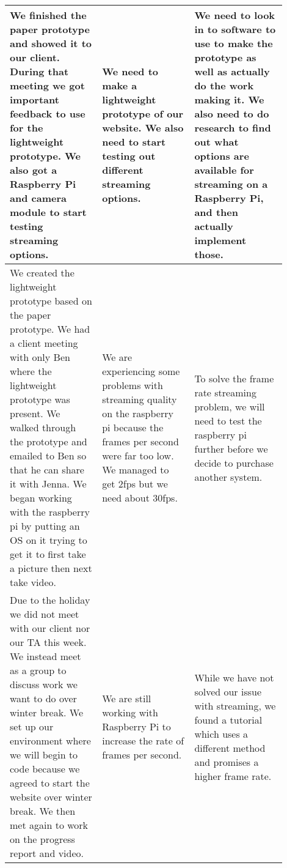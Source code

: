 \documentclass[onecolumn, draftclsnofoot,10pt, compsoc]{IEEEtran}
\begin{document}
         \newpage
         \begin{tabular}{p{0.3\linewidth} | p{0.3\linewidth} | p{0.3\linewidth}}
         We finished the paper prototype and showed it to our client. During that meeting we got important feedback to use for the lightweight prototype. We also got a Raspberry Pi and camera module to start testing streaming options.&
         We need to make a lightweight prototype of our website. We also need to start testing out different streaming options.&
         We need to look in to software to use to make the prototype as well as actually do the work making it. We also need to do research to find out what options are available for streaming on a Raspberry Pi, and then actually implement those.\\
         \hline
         We created the lightweight prototype based on the paper prototype. We had a client meeting with only Ben where the lightweight prototype was present. We walked through the prototype and emailed to Ben so that he can share it with Jenna. We began working with the raspberry pi by putting an OS on it trying to get it to first take a picture then next take video.&
         We are experiencing some problems with streaming quality on the raspberry pi because the frames per second were far too low. We managed to get 2fps but we need about 30fps. &
         To solve the frame rate streaming problem, we will need to test the raspberry pi further before we decide to purchase another system.\\
         \hline
         Due to the holiday we did not meet with our client nor our TA this week. We instead meet as a group to discuss work we want to do over winter break. We set up our environment where we will begin to code because we agreed to start the website over winter break. We then met again to work on the progress report and video. &
         We are still working with Raspberry Pi to increase the rate of frames per second.&
         While we have not solved our issue with streaming, we found a tutorial which uses a different method and promises a higher frame rate.\\
        \end{tabular}    
        \pagebreak
    
\end{document}
